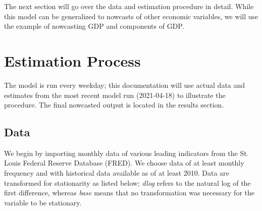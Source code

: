 \documentclass[11pt, letterpaper]{article}\usepackage[]{graphicx}\usepackage[]{color}
\begin{document}
The next section will go over the data and estimation procedure in detail. While this model can be generalized to nowcasts of other economic variables, we will use the example of nowcasting GDP and components of GDP.

\newpage
\section{Estimation Process}
The model is run every weekday; this documentation will use actual data and estimates from the most recent model run (2021-04-18) to illustrate the procedure. The final nowcasted output is located in the results section.

\subsection{Data}
We begin by importing monthly data of various leading indicators from the St. Louis Federal Reserve Database (FRED). We choose data of at least monthly frequency and with historical data available as of at least 2010. Data are transformed for stationarity as listed below; \textit{dlog} refers to the natural log of the first difference, whereas \textit{base} means that no transformation was necessary for the variable to be stationary.
\end{document}
